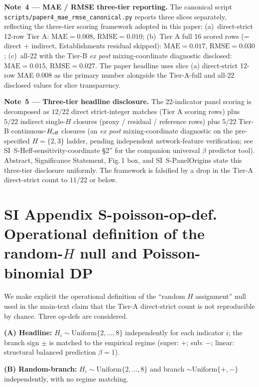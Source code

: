 \textbf{Note~4 --- MAE / RMSE three-tier reporting.} The canonical script \texttt{scripts/paper4\_mae\_rmse\_canonical.py} reports three slices separately, reflecting the three-tier scoring framework adopted in this paper: (a)~direct-strict 12-row Tier A: $\mathrm{MAE}\!=\!0.008$, $\mathrm{RMSE}\!=\!0.010$; (b)~Tier A full 16 scored rows (= direct + indirect, Establishments residual skipped): $\mathrm{MAE}\!=\!0.017$, $\mathrm{RMSE}\!=\!0.030$; (c)~all-22 with the Tier-B \emph{ex post} mixing-coordinate diagnostic disclosed: $\mathrm{MAE}\!=\!0.015$, $\mathrm{RMSE}\!=\!0.027$. The paper headline uses slice (a) direct-strict 12-row MAE $0.008$ as the primary number alongside the Tier-A-full and all-22 disclosed values for slice transparency.

\textbf{Note~5 --- Three-tier headline disclosure.} The 22-indicator panel scoring is decomposed as $12/22$ direct strict-integer matches (Tier A scoring rows) plus $5/22$ indirect single-$H$ closures (proxy / residual / reference rows) plus $5/22$ Tier-B continuous-$H_{\rm eff}$ closures (an \emph{ex post} mixing-coordinate diagnostic on the pre-specified $H\!=\!\{2,3\}$ ladder, pending independent network-feature verification; see SI~\textsf{S-Heff-sensitivity-coordinate} \S2'' for the companion universal $\beta$ predictor tool). Abstract, Significance Statement, Fig.\,1 box, and SI~\textsf{S-PanelOrigins} state this three-tier disclosure uniformly. The framework is falsified by a drop in the Tier-A direct-strict count to $11/22$ or below.

\clearpage
\section*{SI Appendix S-poisson-op-def. Operational definition of the random-$H$ null and Poisson-binomial DP}\label{sec:S-poisson-op-def}

\sloppy
We make explicit the operational definition of the ``random $H$ assignment'' null used in the main-text claim that the Tier-A direct-strict count is not reproducible by chance. Three op-defs are considered.

\textbf{(A) Headline:} $H_i\sim\mathrm{Uniform}\{2,\dots,8\}$ independently for each indicator $i$; the branch sign $\pm$ is matched to the empirical regime (super: $+$; sub: $-$; linear: structural balanced prediction $\beta\!=\!1$).

\textbf{(B) Random-branch:} $H_i\sim\mathrm{Uniform}\{2,\dots,8\}$ and branch $\sim\mathrm{Uniform}\{+,-\}$ independently, with no regime matching.

